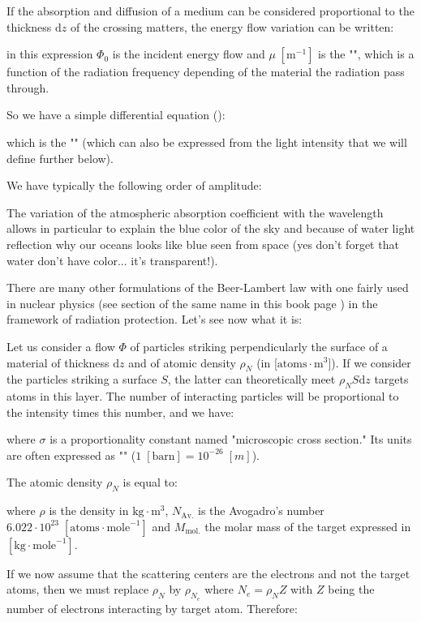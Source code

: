 	If the absorption and diffusion of a medium can be considered proportional to the thickness $\mathrm{d}z$ of the crossing matters, the energy flow variation can be written:
	
	in this expression $\Phi_0$ is the incident energy flow and $\mu\;[\text{m}^{-1}]$ is the "", which is a function of the radiation frequency depending of the material the radiation pass through.
	
	So we have a simple differential equation ():
	
	which is the "" (which can also be expressed from the light intensity that we will define further below).
	
	We have typically the following order of amplitude:
	
	\begin{tcolorbox}[title=Remark,colframe=black,arc=10pt]
	The variation of the atmospheric absorption coefficient with the wavelength allows in particular to explain the blue color of the sky and because of water light reflection why our oceans looks like blue seen from space (yes don't forget that water don't have color... it's transparent!).
	\end{tcolorbox}
	There are many other formulations of the Beer-Lambert law with one fairly used in nuclear physics (see section of the same name in this book page \pageref{nuclear physics}) in the framework of radiation protection. Let's see now what it is:
	
	Let us consider a flow $\Phi$ of particles striking perpendicularly the surface of a material of thickness $\mathrm{d}z$ and of atomic density $\rho_N$ (in [$\text{atoms}\cdot \text{m}^3$]). If we consider the particles striking a surface $S$, the latter can theoretically meet $\rho_NS\mathrm{d}z$ targets atoms in this layer. The number of interacting particles will be proportional to the intensity times this number, and we have:
	
	where $\sigma$ is a proportionality constant named "microscopic cross section." Its units are often expressed as "" ($1\;[\text{barn}]=10^{-26}\;[m]$).
	\begin{tcolorbox}[title=Remark,colframe=black,arc=10pt]
	The atomic density $\rho_N$ is equal to:
	
	where  $\rho$ is the density in $\text{kg}\cdot\text{m}^3$, $N_\text{Av.}$ is the Avogadro's number $6.022\cdot 10^{23}\; [\text{atoms}\cdot \text{mole}^{-1}]$ and $M_\text{mol.}$ the molar mass of the target expressed in $[\text{kg}\cdot \text{mole}^{-1}]$.
	\end{tcolorbox}
	If we now assume that the scattering centers are the electrons and not the target atoms, then we must replace $\rho_N$ by $\rho_{N_e}$ where $N_e=\rho_NZ$ with $Z$ being the number of electrons interacting by target atom. Therefore:
	
